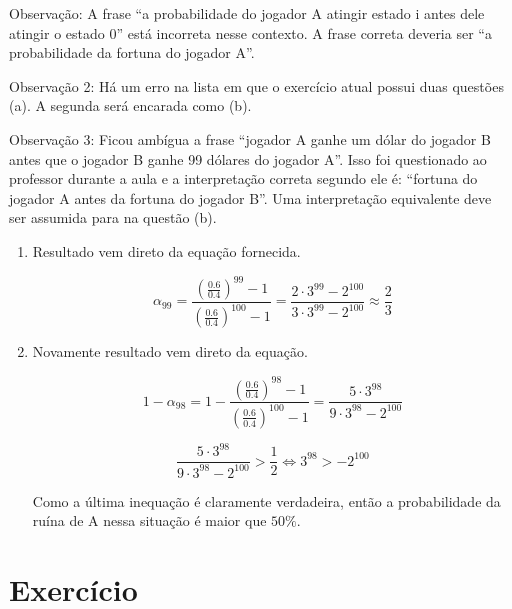 \documentclass{article}
\begin{document}
Observação: A frase ``a probabilidade do jogador A atingir estado i antes dele atingir o estado 0'' está incorreta nesse contexto. A frase correta deveria ser ``a probabilidade da fortuna do jogador A''.

Observação 2: Há um erro na lista em que o exercício atual possui duas questões (a). A segunda será encarada como (b).

Observação 3: Ficou ambígua a frase ``jogador A ganhe um dólar do jogador B antes que o jogador B ganhe 99 dólares do jogador A''. Isso foi questionado ao professor durante a aula e a interpretação correta segundo ele é: ``fortuna do jogador A antes da fortuna do jogador B''. Uma interpretação equivalente deve ser assumida para na questão (b).

\begin{enumerate}[label=(\alph*)]
    \item Resultado vem direto da equação fornecida.
    
    $$\alpha_{99} = \frac{(\frac{0.6}{0.4})^{99}-1}{(\frac{0.6}{0.4})^{100}-1} = \frac{2\cdot 3^{99}-2^{100}}{3\cdot 3^{99}-2^{100}}\approx \frac{2}{3}$$
    
    \item Novamente resultado vem direto da equação.
    
    $$1-\alpha_{98} = 1-\frac{(\frac{0.6}{0.4})^{98}-1}{(\frac{0.6}{0.4})^{100}-1} = \frac{5\cdot 3^{98}}{9\cdot 3^{98}-2^{100}}$$
    
    $$\frac{5\cdot 3^{98}}{9\cdot 3^{98}-2^{100}} > \frac{1}{2} \Leftrightarrow 3^{98} > -2^{100}$$
    
    Como a última inequação é claramente verdadeira, então a probabilidade da ruína de A nessa situação é maior que $50\%$. 

\end{enumerate}

\newpage

\section{Exercício}
\end{document}
